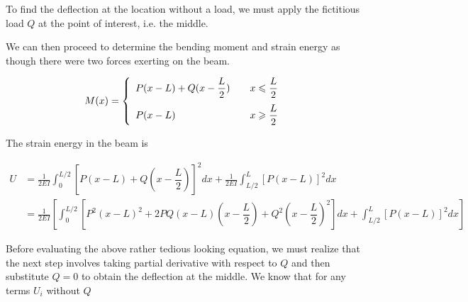 \documentclass[
10pt,
a4paper,
openany,
svgnames,
]{kaobook} %
\begin{document}
\begin{solution}
  To find the deflection at the location without a load, we must apply the fictitious load $Q$ at the point of interest, i.e. the middle.

   \begin{figure}[H]
    \centering
  \end{figure}

    We can then proceed to determine the bending moment and strain energy as though there were two forces exerting on the beam.
    
    \begin{align*}
      M(x) &= \left\{
      \begin{array}{l l l}
        P(x - L) + Q(x - \dfrac{L}{2}) & & x \leqslant \dfrac{L}{2} \\[1em]
        P(x - L) & & x \geqslant \dfrac{L}{2}
      \end{array} \right. \\
    \end{align*}

    The strain energy in the beam is

    \begin{align*}
      U &= \frac{1}{2EI} \int_0^{L/2} \left[ P(x - L) + Q(x - \dfrac{L}{2}) \right]^2dx + \frac{1}{2EI} \int_{L/2}^L \left[ P(x-L) \right]^2dx \\
        &= \frac{1}{2EI} \left[ \int_0^{L/2} \left[ P^2(x-L)^2 + 2PQ(x-L)(x-\dfrac{L}{2}) + Q^2(x - \dfrac{L}{2})^2 \right] dx +  \int_{L/2}^L \left[ P(x-L) \right]^2dx \right]
    \end{align*}

    Before evaluating the above rather tedious looking equation, we must realize that the next step involves taking partial derivative with respect to $Q$ and then substitute $Q = 0$ to obtain the deflection at the middle. We know that for any terms $U_i$ without $Q$


\end{solution}
\end{document}
